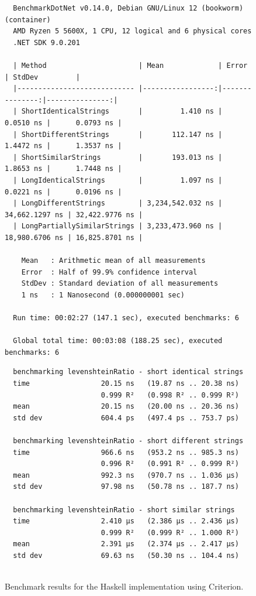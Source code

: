 \begin{landscape}
\begin{figure}[H]
\begin{verbatim}
  BenchmarkDotNet v0.14.0, Debian GNU/Linux 12 (bookworm) (container)
  AMD Ryzen 5 5600X, 1 CPU, 12 logical and 6 physical cores
  .NET SDK 9.0.201

  | Method                      | Mean             | Error          | StdDev         |
  |---------------------------- |-----------------:|---------------:|---------------:|
  | ShortIdenticalStrings       |         1.410 ns |      0.0510 ns |      0.0793 ns |
  | ShortDifferentStrings       |       112.147 ns |      1.4472 ns |      1.3537 ns |
  | ShortSimilarStrings         |       193.013 ns |      1.8653 ns |      1.7448 ns |
  | LongIdenticalStrings        |         1.097 ns |      0.0221 ns |      0.0196 ns |
  | LongDifferentStrings        | 3,234,542.032 ns | 34,662.1297 ns | 32,422.9776 ns |
  | LongPartiallySimilarStrings | 3,233,473.960 ns | 18,980.6706 ns | 16,825.8701 ns |

    Mean   : Arithmetic mean of all measurements
    Error  : Half of 99.9% confidence interval
    StdDev : Standard deviation of all measurements
    1 ns   : 1 Nanosecond (0.000000001 sec)

  Run time: 00:02:27 (147.1 sec), executed benchmarks: 6

  Global total time: 00:03:08 (188.25 sec), executed benchmarks: 6
  \end{verbatim}
\end{figure}
\hfill

\begin{figure}[H]
  \caption{Benchmark results for the Haskell implementation using Criterion.}
  \label{code:benchmark-haskell}
  \begin{verbatim}
  benchmarking levenshteinRatio - short identical strings
  time                 20.15 ns   (19.87 ns .. 20.38 ns)
                       0.999 R²   (0.998 R² .. 0.999 R²)
  mean                 20.15 ns   (20.00 ns .. 20.36 ns)
  std dev              604.4 ps   (497.4 ps .. 753.7 ps)

  benchmarking levenshteinRatio - short different strings
  time                 966.6 ns   (953.2 ns .. 985.3 ns)
                       0.996 R²   (0.991 R² .. 0.999 R²)
  mean                 992.3 ns   (970.7 ns .. 1.036 μs)
  std dev              97.98 ns   (50.78 ns .. 187.7 ns)

  benchmarking levenshteinRatio - short similar strings
  time                 2.410 μs   (2.386 μs .. 2.436 μs)
                       0.999 R²   (0.999 R² .. 1.000 R²)
  mean                 2.391 μs   (2.374 μs .. 2.417 μs)
  std dev              69.63 ns   (50.30 ns .. 104.4 ns)


\end{verbatim}
\end{figure}
\end{landscape}
